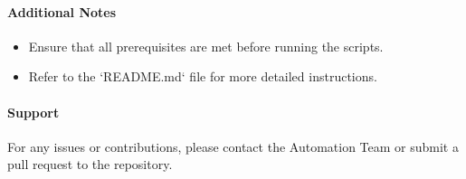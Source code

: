 \documentclass[11pt,headings=small]{scrartcl}
\begin{document}
\paragraph{Additional Notes}
\begin{itemize}
    \item Ensure that all prerequisites are met before running the scripts.
    \item Refer to the `README.md` file for more detailed instructions.
\end{itemize}

\paragraph{Support}
For any issues or contributions, please contact the Automation Team or submit a pull request to the repository.
\end{document}
